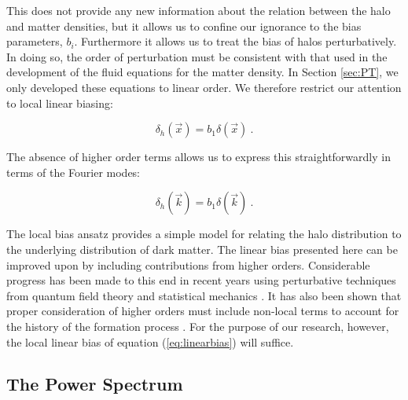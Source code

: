 \documentclass[10pt,letterpaper,final]{iopart}
\numberwithin{equation}{subsection}
\def\ni{\noindent}
\begin{document}
\ni This does not provide any new information about the relation between the halo and matter densities, but it allows us to confine our ignorance to the bias parameters, $b_i$. Furthermore it allows us to treat the bias of halos perturbatively. In doing so, the order of perturbation must be consistent with that used in the development of the fluid equations for the matter density. In Section \ref{sec:PT}, we only developed these equations to linear order. We therefore restrict our attention to local linear biasing:

\begin{equation}\label{eq:linearbias}
\delta_h(\vec{x}) = b_1 \delta(\vec{x}) \ .
\end{equation}

\ni The absence of higher order terms allows us to express this straightforwardly in terms of the Fourier modes:

\begin{equation}\label{eq:linearbias2}
\delta_h(\vec{k}) = b_1 \delta(\vec{k}) \ .
\end{equation}

\ni The local bias ansatz provides a simple model for relating the halo distribution to the underlying distribution of dark matter. The linear bias presented here can be improved upon by including contributions from higher orders. Considerable progress has been made to this end in recent years using perturbative techniques from quantum field theory and statistical mechanics \cite{Halo2}\cite{HaloBias1}\cite{HaloBias2}\cite{HaloBias3}\cite{HaloBias4}. It has also been shown that proper consideration of higher orders must include non-local terms to account for the history of the formation process \cite{HaloBias2}\cite{HaloBias4}. For the purpose of our research, however, the local linear bias of equation (\ref{eq:linearbias}) will suffice.



%

\subsection{The Power Spectrum}\label{sec:PS}
\end{document}
